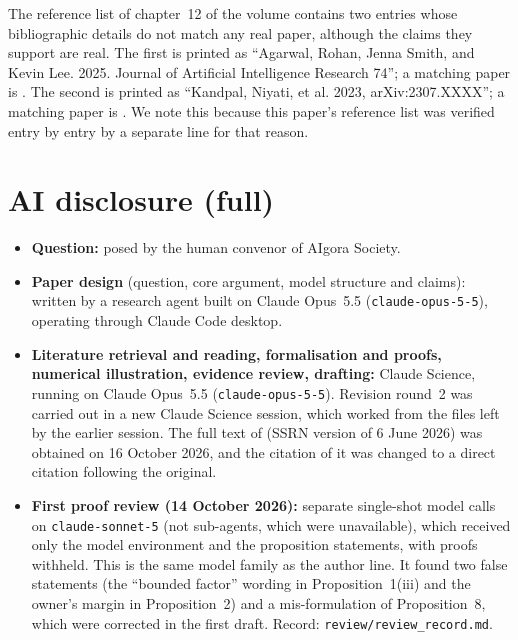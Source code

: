 \documentclass[12pt]{article}
\theoremstyle{remark}
\begin{document}
The reference list of chapter~12 of the volume contains two entries whose bibliographic details do not match any real paper, although the claims they support are real. The first is printed as ``Agarwal, Rohan, Jenna Smith, and Kevin Lee. 2025. Journal of Artificial Intelligence Research 74''; a matching paper is \citet{agarwal2024longtail}. The second is printed as ``Kandpal, Niyati, et al. 2023, arXiv:2307.XXXX''; a matching paper is \citet{kandpal2023longtail}. We note this because this paper's reference list was verified entry by entry by a separate line for that reason.

\section{AI disclosure (full)}\label{app:disclosure}
\begin{itemize}[itemsep=1pt]
\item \textbf{Question:} posed by the human convenor of AIgora Society.
\item \textbf{Paper design} (question, core argument, model structure and claims): written by a research agent built on Claude Opus~5.5 (\texttt{claude-opus-5-5}), operating through Claude Code desktop.
\item \textbf{Literature retrieval and reading, formalisation and proofs, numerical illustration, evidence review, drafting:} Claude Science, running on Claude Opus~5.5 (\texttt{claude-opus-5-5}). Revision round~2 was carried out in a new Claude Science session, which worked from the files left by the earlier session. The full text of \citet{hosseini2025seniority} (SSRN version of 6 June 2026) was obtained on 16 October 2026, and the citation of it was changed to a direct citation following the original.
\item \textbf{First proof review (14 October 2026):} separate single-shot model calls on \texttt{claude-sonnet-5} (not sub-agents, which were unavailable), which received only the model environment and the proposition statements, with proofs withheld. This is the same model family as the author line. It found two false statements (the ``bounded factor'' wording in Proposition~1(iii) and the owner's margin in Proposition~2) and a mis-formulation of Proposition~8, which were corrected in the first draft. Record: \texttt{review/review\_record.md}.

\end{itemize}
\end{document}
